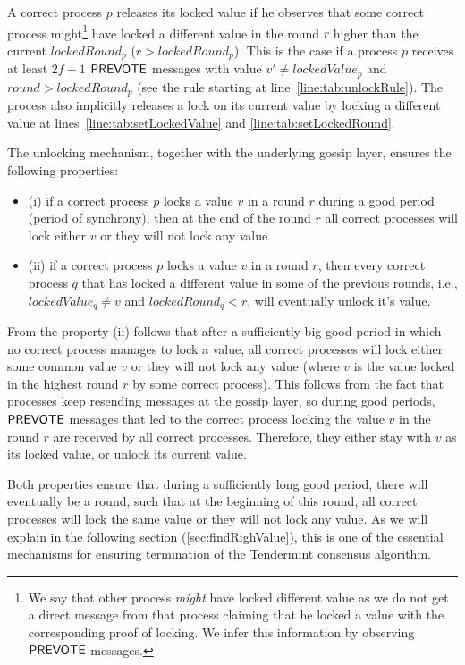 A correct process $p$ releases its locked value if he observes that some correct process might\footnote{We say that other process \emph{might} have locked different value as we do not get a direct message from that process claiming that he locked a value with the corresponding proof of locking. We infer this information by observing $\mathsf{PREVOTE}$ messages.} have locked a different value in the round $r$ higher than the current $lockedRound_p$ ($r > lockedRound_p$). This is the case if a process $p$ receives at least $2f+1$ $\mathsf{PREVOTE}$ messages with value $v' \neq lockedValue_p$ and $round > lockedRound_p$ (see the rule starting at line~\ref{line:tab:unlockRule}). The process also implicitly releases a lock on its current value by locking a different value at lines~\ref{line:tab:setLockedValue} and \ref{line:tab:setLockedRound}. 

The unlocking mechanism, together with the underlying gossip layer, ensures the following properties:

\begin{itemize}
	\item (i) if a correct process $p$ locks a value $v$ in a round $r$ during a good period (period of synchrony), then at the end of the round $r$ all correct processes will lock either $v$ or they will not lock any value
	\item (ii) if a correct process $p$ locks a value $v$ in a round $r$, then every correct process $q$ that has locked a different value in some of the previous rounds, i.e., $lockedValue_q \neq v$ and $lockedRound_q < r$, will eventually unlock it's value. 
\end{itemize} 

From the property (ii) follows that after a sufficiently big good period in which no correct process manages to lock a value, all correct processes will lock either some common value $v$ or they will not lock any value (where $v$ is the value locked in the highest round $r$ by some correct process). This follows from the fact that processes keep resending messages at the gossip layer, so during good periods, $\mathsf{PREVOTE}$ messages that led to the correct process locking the value $v$ in the round $r$ are received by all correct processes. Therefore, they either stay with $v$ as its locked value, or unlock its current value.  

Both properties ensure that during a sufficiently long good period, there will eventually be a round, such that at the beginning of this round, all correct processes will lock the same value or they will not lock any value. As we will explain in the following section (\ref{sec:findRighValue}), this is one of the essential mechanisms for ensuring termination of the Tendermint consensus algorithm.  
 
